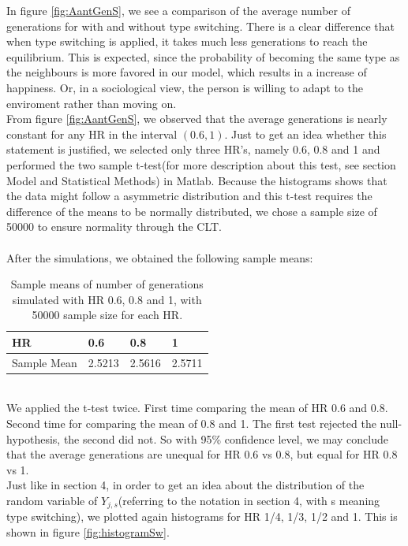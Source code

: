 In figure \ref{fig:AantGenS}, we see a comparison of the average number of generations for with and without type switching. 
There is a clear difference that when type switching is applied, it takes much less generations to reach the equilibrium. 
This is expected, since the probability of becoming the same type as the neighbours is more favored in our model, which results in a increase of happiness. 
Or, in a sociological view, the person is willing to adapt to the enviroment rather than moving on.\\

From figure \ref{fig:AantGenS}, we observed that the average generations is nearly constant for any HR in the interval \((0.6,1)\). 
Just to get an idea whether this statement is justified, we selected only three HR's, namely 0.6, 0.8 and 1 and performed the two sample t-test(for more description about this test, see section Model and Statistical Methods) in Matlab. Because the histograms shows that the data might follow a asymmetric distribution and this t-test requires the difference of the means to be normally distributed, we chose a sample size of 50000 to ensure normality through the CLT.\\
\\
After the simulations, we obtained the following sample means:
\begin{table}[htp]
\centering
\caption{Sample means of number of generations simulated with HR 0.6, 0.8 and 1, with 50000 sample size for each HR.}
\begin{tabular}{|l|l|l|l|}
\hline
 HR&0.6&0.8&1 \\ \hline
 Sample Mean&2.5213&2.5616&2.5711  \\ \hline 
\end{tabular}
\end{table}
\\
We applied the t-test twice. First time comparing the mean of HR 0.6 and 0.8. Second time for comparing the mean of 0.8 and 1. The first test rejected the null-hypothesis, the second did not. So with 95\% confidence level, we may conclude that the average generations are unequal for HR 0.6 vs 0.8, but equal for HR 0.8 vs 1.\\
\newpage
Just like in section 4, in order to get an idea about the distribution of the random variable of $Y_{j,s}$(referring to the notation in section 4, with s meaning type switching), we plotted again histograms for HR 1/4, 1/3, 1/2 and 1. This is shown in figure \ref{fig:histogramSw}.

